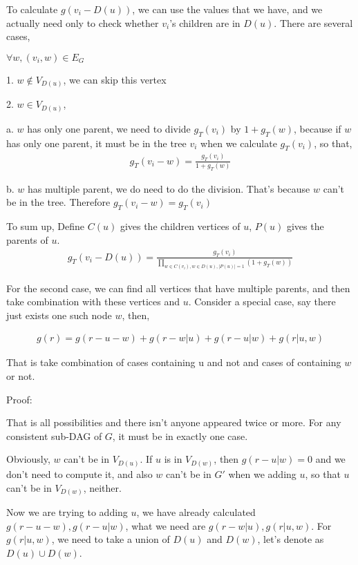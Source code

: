 \documentclass[11pt]{article}
\begin{document}
	\bigskip
	To calculate $g(v_i-D(u))$, we can use the values that we have, and we actually need only to check whether $v_i$'s children are in $D(u)$. There are several cases,
	
	\bigskip
	$\forall w, (v_i, w) \in E_G$
	
	1. $w \notin V_{D(u)}$, we can skip this vertex
	
	2. $w \in V_{D(u)}$,
	
	\qquad a. $w$ has only one parent, we need to divide $g_T(v_i)$ by $1 + g_T(w)$, because if $w$ has only one parent, it must be in the tree $v_i$ when we calculate $g_T(v_i)$, so that,
	\begin{align}
		g_T(v_i-w) = \frac{g_T(v_i)}{1+g_T(w)}
	\end{align}
	
	\qquad b. $w$ has multiple parent, we do need to do the division. That's because $w$ can't be in the tree. Therefore $g_T(v_i-w) = g_T(v_i)$
	
	\bigskip
	To sum up,
	Define $C(u)$ gives the children vertices of $u$, $P(u)$ gives the parents of $u$.
	\begin{align}
		g_T(v_i-D(u)) = \frac{g_T(v_i)}{\prod_{w \in C(v_i), w \in D(u), |P(u)| = 1}(1+g_T(w))}
	\end{align}

	\bigskip
	For the second case, we can find all vertices that have multiple parents, and then take combination with these vertices and $u$. Consider a special case, say there just exists one such node $w$, then,
	
	\begin{align}
		g(r) = g(r-u-w) + g(r-w|u) + g(r-u|w) + g(r|u,w)
	\end{align}
	
	That is take combination of cases containing u and not and cases of containing $w$ or not.
	
	\bigskip
	Proof:
	
	That is all possibilities and there isn't anyone appeared twice or more. For any consistent sub-DAG of $G$, it must be in exactly one case.
	
	\bigskip
	Obviously, $w$ can't be in $V_{D(u)}$. If $u$ is in $V_{D(w)}$, then $g(r-u|w) = 0$ and we don't need to compute it, and also $w$ can't be in $G'$ when we adding $u$, so that $u$ can't be in $V_{D(w)}$, neither.
	
	\bigskip
	Now we are trying to adding $u$, we have already calculated $g(r-u-w), g(r-u|w)$, what we need are $g(r-w|u), g(r|u,w)$.
	For $g(r|u,w)$, we need to take a union of $D(u)$ and $D(w)$, let's denote as $D(u) \cup D(w)$.
	
\end{document}
